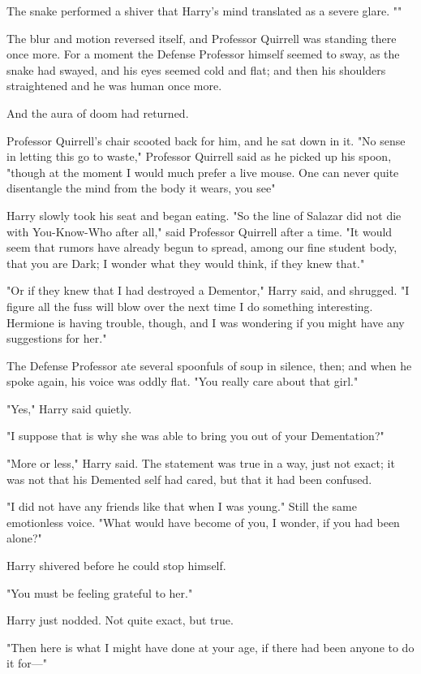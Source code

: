 The snake performed a shiver that Harry's mind translated as a severe glare.
""

The blur and motion reversed itself, and Professor Quirrell was standing there
once more. For a moment the Defense Professor himself seemed to sway, as the
snake had swayed, and his eyes seemed cold and flat; and then his shoulders
straightened and he was human once more.

And the aura of doom had returned.

Professor Quirrell's chair scooted back for him, and he sat down in it. "No
sense in letting this go to waste," Professor Quirrell said as he picked up his
spoon, "though at the moment I would much prefer a live mouse. One can never
quite disentangle the mind from the body it wears, you see{\el}"

Harry slowly took his seat and began eating.
\sbreak
"So the line of Salazar did not die with You-Know-Who after all," said
Professor Quirrell after a time. "It would seem that rumors have already begun
to spread, among our fine student body, that you are Dark; I wonder what they
would think, if they knew that."

"Or if they knew that I had destroyed a Dementor," Harry said, and shrugged. "I
figure all the fuss will blow over the next time I do something
interesting. Hermione is having trouble, though, and I was wondering if you
might have any suggestions for her."

The Defense Professor ate several spoonfuls of soup in silence, then; and when
he spoke again, his voice was oddly flat. "You really care about that girl."

"Yes," Harry said quietly.

"I suppose that is why she was able to bring you out of your Dementation?"

"More or less," Harry said. The statement was true in a way, just not exact; it
was not that his Demented self had cared, but that it had been confused.

"I did not have any friends like that when I was young." Still the same
emotionless voice. "What would have become of you, I wonder, if you had been
alone?"

Harry shivered before he could stop himself.

"You must be feeling grateful to her."

Harry just nodded. Not quite exact, but true.

"Then here is what I might have done at your age, if there had been anyone to
do it for\mbox{---}"
